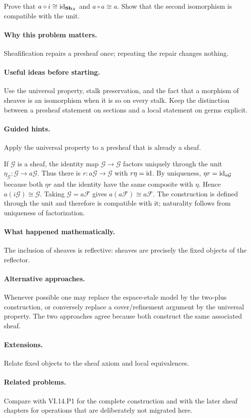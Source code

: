 \begin{problem}
Prove that $a\circ i\cong\operatorname{id}_{\mathbf{Sh}_X}$ and $a\circ a\cong a$. Show that the second isomorphism is compatible with the unit.
\end{problem}

\paragraph{Why this problem matters.}
Sheafification repairs a presheaf once; repeating the repair changes nothing.

\paragraph{Useful ideas before starting.}
Use the universal property, stalk preservation, and the fact that a morphism of sheaves is an isomorphism when it is so on every stalk.  Keep the distinction between a presheaf statement on sections and a local statement on germs explicit.

\paragraph{Guided hints.}
Apply the universal property to a presheaf that is already a sheaf.

\ifdefined\FullProblemDossiers
\begin{solution}
If $\mathcal G$ is a sheaf, the identity map $\mathcal G\to\mathcal G$ factors uniquely through the unit $\eta_{\mathcal G}:\mathcal G\to a\mathcal G$. Thus there is $r:a\mathcal G\to\mathcal G$ with $r\eta=\operatorname{id}$. By uniqueness, $\eta r=\operatorname{id}_{a\mathcal G}$ because both $\eta r$ and the identity have the same composite with $\eta$. Hence $a(i\mathcal G)\cong\mathcal G$. Taking $\mathcal G=a\mathcal F$ gives $a(a\mathcal F)\cong a\mathcal F$. The construction is defined through the unit and therefore is compatible with it; naturality follows from uniqueness of factorization.
\end{solution}

\paragraph{What happened mathematically.}
The inclusion of sheaves is reflective: sheaves are precisely the fixed objects of the reflector.

\paragraph{Alternative approaches.}
Whenever possible one may replace the espace-etale model by the two-plus construction, or conversely replace a cover/refinement argument by the universal property.  The two approaches agree because both construct the same associated sheaf.

\paragraph{Extensions.}
Relate fixed objects to the sheaf axiom and local equivalences.

\paragraph{Related problems.}
Compare with VI.14.P1 for the complete construction and with the later sheaf chapters for operations that are deliberately not migrated here.
\fi
